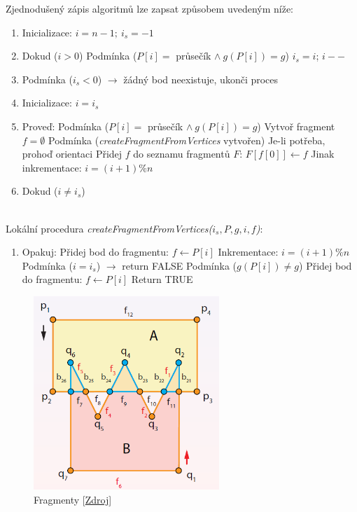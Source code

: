 \documentclass[a4paper, 12pt]{article}
\begin{document}
Zjednodušený zápis algoritmů lze zapsat způsobem uvedeným níže:
\begin{enumerate}
\item Inicializace: $i = n-1;~i_s = -1$
\item Dokud ($i > 0$)
\subitem Podmínka ($P[i] =$ průsečík $\land~g(P[i]) = g$)
\subitem \hspace {0.5cm} $i_s = i$; $i--$ 
\item Podmínka ($i_s < 0$) $\rightarrow$ žádný bod neexistuje, ukonči proces
\item Inicializace: $i = i_s$
\item Proveď: 
\subitem Podmínka ($P[i] =$ průsečík $\land~g(P[i]) = g$)
\subitem \hspace {0.5cm} Vytvoř fragment $f = \emptyset$ 
\subitem \hspace {0.5cm} Podmínka (\textit{createFragmentFromVertices} vytvořen)
\subitem \hspace {1cm} Je-li potřeba, prohoď orientaci
\subitem \hspace {1cm} Přidej $f$ do seznamu fragmentů $F$: $F[f[0]] \leftarrow f$
\subitem Jinak inkrementace: $i = (i+1)\%n$
\item[] Dokud ($i \neq i_s$)
\end{enumerate}
~\\

Lokální procedura \textit{createFragmentFromVertices($i_s, P, g, i, f$)}:
\begin{enumerate}
\item[] Opakuj:
\subitem Přidej bod do fragmentu: $f \leftarrow P[i]$
\subitem Inkrementace: $i = (i+1)\%n$
\subitem Podmínka ($i = i_s$) $\rightarrow$ return FALSE
\subitem Podmínka ($g(P[i]) \neq g$)
\subitem \hspace {0.5cm} Přidej bod do fragmentu: $f \leftarrow P[i]$
\subitem \hspace {0.5cm} Return TRUE
\end{enumerate}

\begin{figure}[h!]
	\centering
	\includegraphics[width=7cm]{./pictures/doc_fragments.png}
	\caption{Fragmenty [\href{https://web.natur.cuni.cz/~bayertom/images/courses/Adk/adk9.pdf}{Zdroj}]}
\end{figure}
\end{document}
